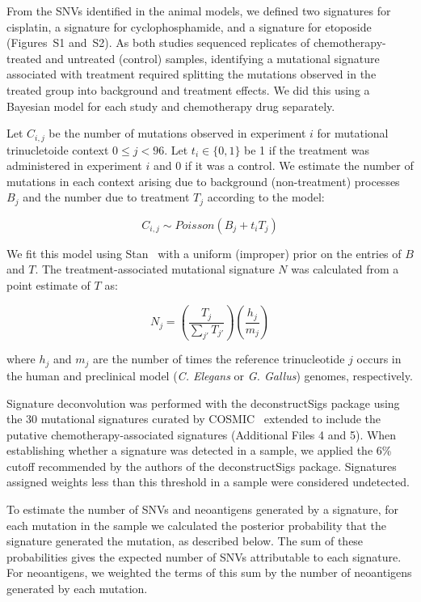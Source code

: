 \documentclass[linenumbers]{bmcart}
\begin{document}
From the SNVs identified in the animal models, we defined two signatures for cisplatin, a signature for cyclophosphamide, and a signature for etoposide (Figures~S1 and~S2). As both studies sequenced replicates of chemotherapy-treated and untreated (control) samples, identifying a mutational signature associated with treatment required splitting the mutations observed in the treated group into background and treatment effects. We did this using a Bayesian model for each study and chemotherapy drug separately.

Let $C_{i,j}$ be the number of mutations observed in experiment $i$ for mutational trinucletoide context $0 \leq j < 96$. Let $t_i \in \{0,1\}$ be 1 if the treatment was administered in experiment $i$ and 0 if it was a control. We estimate the number of mutations in each context arising due to background (non-treatment) processes $B_j$ and the number due to treatment $T_j$ according to the model:

\[
C_{i,j} \sim \mathit{Poisson}(B_j + t_i T_j)
\]

We fit this model using Stan~\cite{Gelman_2015} with a uniform (improper) prior on the entries of $B$ and $T$. The treatment-associated mutational signature $N$ was calculated from a point estimate of $T$ as:

\[
N_j = \left ( \frac{T_j}{\sum_{j'}{T_{j'}}} \right ) \left ( \frac{h_j}{m_j} \right )
\]

where $h_j$ and $m_j$ are the number of times the reference trinucleotide $j$ occurs in the human and preclinical model (\textit{C. Elegans} or \textit{G. Gallus}) genomes, respectively.


Signature deconvolution was performed with the deconstructSigs\cite{Rosenthal_2016} package using the 30 mutational signatures curated by COSMIC~\cite{364242} extended to include the putative chemotherapy-associated signatures (Additional Files 4 and 5). When establishing whether a signature was detected in a sample, we applied the 6\% cutoff recommended by the authors of the deconstructSigs package. Signatures assigned weights less than this threshold in a sample were considered undetected.


To estimate the number of SNVs and neoantigens generated by a signature, for each mutation in the sample we calculated the posterior probability that the signature generated the mutation, as described below. The sum of these probabilities gives the expected number of SNVs attributable to each signature. For neoantigens, we weighted the terms of this sum by the number of neoantigens generated by each mutation.
\end{document}
